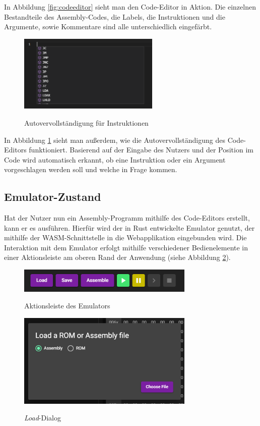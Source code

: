 In Abbildung \ref{fig:codeeditor} sieht man den Code-Editor in Aktion. Die einzelnen Bestandteile des Assembly-Codes, die Labels, die Instruktionen und die Argumente, sowie Kommentare sind alle unterschiedlich eingefärbt.

\begin{figure}
    \caption{Autovervollständigung für Instruktionen}
    \centering
    \includegraphics[width=0.6\textwidth]{Bilder/Completion1.png}
    \label{fig:completion1}
\end{figure}

In Abbildung \ref{fig:completion1} sieht man außerdem, wie die Autovervollständigung des Code-Editors funktioniert. Basierend auf der Eingabe des Nutzers und der Position im Code wird automatisch erkannt, ob eine Instruktion oder ein Argument vorgeschlagen werden soll und welche in Frage kommen.

\subsection{Emulator-Zustand}

Hat der Nutzer nun ein Assembly-Programm mithilfe des Code-Editors erstellt, kann er es ausführen. Hierfür wird der in Rust entwickelte Emulator genutzt, der mithilfe der \ac{WASM}-Schnittstelle in die Webapplikation eingebunden wird. Die Interaktion mit dem Emulator erfolgt mithilfe verschiedener Bedienelemente in einer Aktionsleiste am oberen Rand der Anwendung (siehe Abbildung \ref{fig:actionbar}).

\begin{figure}[h]
    \caption{Aktionsleiste des Emulators}
    \centering
    \includegraphics[width=0.75\textwidth]{Bilder/Aktionsleiste.png}
    \label{fig:actionbar}
\end{figure}

\begin{figure}
    \caption{\textit{Load}-Dialog}
    \centering
    \includegraphics[width=0.75\textwidth]{Bilder/LoadDialog.png}
    \label{fig:loaddialog}
\end{figure}

